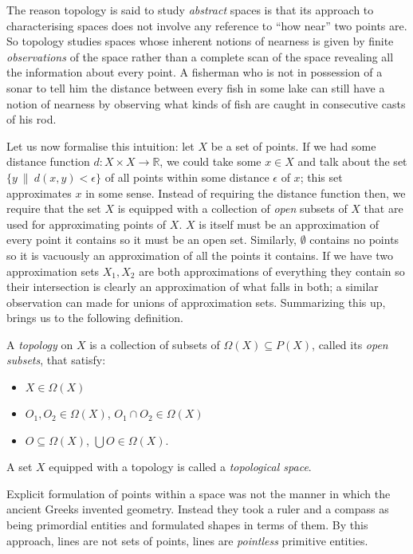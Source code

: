 \documentclass{article}
\begin{document}
The reason topology is said to study \emph{abstract} spaces is that its approach to
characterising spaces does not involve any reference to ``how near'' two points are. So
topology studies spaces whose inherent notions of nearness is given by finite
\emph{observations} of the space rather than a complete scan of the space revealing all
the information about every point. A fisherman who is not in possession of a sonar to tell
him the distance between every fish in some lake can still have a notion of nearness by
observing what kinds of fish are caught in consecutive casts of his rod.

Let us now formalise this intuition: let $X$ be a set of points. If we had some distance
function $d : X \times X \rightarrow \mathbb{R}$, we could take some $x \in X$ and talk about the set
$\{ y\ \|\ d(x, y) < \epsilon \}$ of all points within some distance $\epsilon$ of $x$; this set
approximates $x$ in some sense. Instead of requiring the distance function then, we
require that the set $X$ is equipped with a collection of \emph{open} subsets of $X$ that
are used for approximating points of $X$. $X$ is itself must be an approximation of every
point it contains so it must be an open set. Similarly, $\emptyset$ contains no points so it is
vacuously an approximation of all the points it contains. If we have two approximation
sets $X_1, X_2$ are both approximations of everything they contain so their intersection
is clearly an approximation of what falls in both; a similar observation can made for
unions of approximation sets. Summarizing this up, brings us to the following definition.

A \emph{topology} on $X$ is a collection of subsets of $\Omega(X) \subseteq P(X)$, called its
\emph{open subsets}, that satisfy:
\begin{itemize}
  \item $X \in \Omega(X)$
  \item $O_1, O_2 \in \Omega(X)$, $O_1 \cap O_2 \in \Omega(X)$
  \item $O \subseteq \Omega(X)$, $\bigcup O \in \Omega(X)$.
\end{itemize}

A set $X$ equipped with a topology is called a \emph{topological space}.

Explicit formulation of points within a space was not the manner in which the ancient
Greeks invented geometry. Instead they took a ruler and a compass as being primordial
entities and formulated shapes in terms of them. By this approach, lines are not sets of
points, lines are \emph{pointless} primitive entities.
\end{document}

